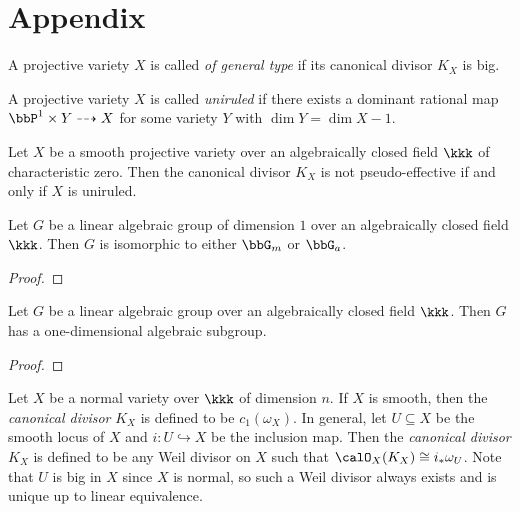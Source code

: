 \section{Appendix}

    \begin{definition}\label{def:variety_of_general_type}
        A projective variety \(X\) is called \emph{of general type} if its canonical divisor \(K_X\) is big.
    \end{definition}

    \begin{definition}\label{def:uniruled_variety}
        A projective variety \(X\) is called \emph{uniruled} if there exists a dominant rational map \(\bbP^1\times Y\dashrightarrow X\) for some variety \(Y\) with \(\dim Y=\dim X-1\).
    \end{definition}

    \begin{theorem}\label{thm:K_X_not_pseudo_effective_iff_uniruled}
        Let \(X\) be a smooth projective variety over an algebraically closed field \(\kkk\) of characteristic zero.
        Then the canonical divisor \(K_X\) is not pseudo-effective if and only if \(X\) is uniruled.
    \end{theorem}

    \begin{theorem}\label{thm:classification_of_linear_alg_gp_of_dim1}
        Let \(G\) be a linear algebraic group of dimension \(1\) over an algebraically closed field \(\kkk\). 
        Then \(G\) is isomorphic to either \(\bbG_m\) or \(\bbG_a\).
    \end{theorem}
    \begin{proof}
    \end{proof}

    \begin{lemma}\label{lem:any_linear_alg_gp_has_one_dimensional_alg_subgroup}
        Let \(G\) be a linear algebraic group over an algebraically closed field \(\kkk\). 
        Then \(G\) has a one-dimensional algebraic subgroup.
    \end{lemma}
    \begin{proof}
    \end{proof}

    \begin{definition}\label{def:canonical_divisor_on_normal_varieties}
        Let \(X\) be a normal variety over \(\kkk\) of dimension \(n\).
        If \(X\) is smooth, then the \emph{canonical divisor} \(K_X\) is defined to be \(c_1(\omega_X)\).
        In general, let \(U\subseteq X\) be the smooth locus of \(X\) and \(i:U\hookrightarrow X\) be the inclusion map.
        Then the \emph{canonical divisor} \(K_X\) is defined to be any Weil divisor on \(X\) such that \(\calO_X(K_X)\cong i_*\omega_U\).
        Note that \(U\) is big in \(X\) since \(X\) is normal, so such a Weil divisor always exists and is unique up to linear equivalence.
    \end{definition}


